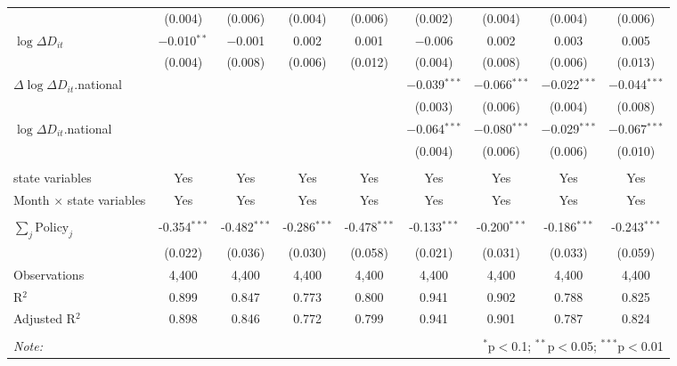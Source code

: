 \begin{tabular}{@{\extracolsep{1pt}}lcccccccc}
  & (0.004) & (0.006) & (0.004) & (0.006) & (0.002) & (0.004) & (0.004) & (0.006) \\ 
  $\log \Delta D_{it}$ & $-$0.010$^{**}$ & $-$0.001 & 0.002 & 0.001 & $-$0.006 & 0.002 & 0.003 & 0.005 \\ 
  & (0.004) & (0.008) & (0.006) & (0.012) & (0.004) & (0.008) & (0.006) & (0.013) \\ 
  $\Delta \log \Delta D_{it}$.national &  &  &  &  & $-$0.039$^{***}$ & $-$0.066$^{***}$ & $-$0.022$^{***}$ & $-$0.044$^{***}$ \\ 
  &  &  &  &  & (0.003) & (0.006) & (0.004) & (0.008) \\ 
  $\log \Delta D_{it}$.national &  &  &  &  & $-$0.064$^{***}$ & $-$0.080$^{***}$ & $-$0.029$^{***}$ & $-$0.067$^{***}$ \\ 
  &  &  &  &  & (0.004) & (0.006) & (0.006) & (0.010) \\ 
 \hline \\[-1.8ex] 
state variables & Yes & Yes & Yes & Yes & Yes & Yes & Yes & Yes \\ 
Month $\times$ state variables & Yes & Yes & Yes & Yes & Yes & Yes & Yes & Yes \\ 
\hline \\[-1.8ex] 
$\sum_j \mathrm{Policy}_j$ & -0.354$^{***}$ & -0.482$^{***}$ & -0.286$^{***}$ & -0.478$^{***}$ & -0.133$^{***}$ & -0.200$^{***}$ & -0.186$^{***}$ & -0.243$^{***}$ \\ 
 & (0.022) & (0.036) & (0.030) & (0.058) & (0.021) & (0.031) & (0.033) & (0.059) \\ 
Observations & 4,400 & 4,400 & 4,400 & 4,400 & 4,400 & 4,400 & 4,400 & 4,400 \\ 
R$^{2}$ & 0.899 & 0.847 & 0.773 & 0.800 & 0.941 & 0.902 & 0.788 & 0.825 \\ 
Adjusted R$^{2}$ & 0.898 & 0.846 & 0.772 & 0.799 & 0.941 & 0.901 & 0.787 & 0.824 \\ 
\hline 
\hline \\[-1.8ex] 
\textit{Note:}  & \multicolumn{8}{r}{$^{*}$p$<$0.1; $^{**}$p$<$0.05; $^{***}$p$<$0.01} \\ 
\end{tabular} 